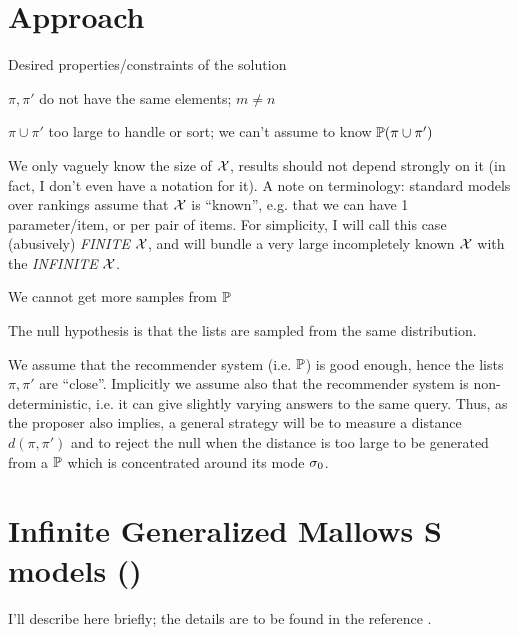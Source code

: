 \documentclass[10pt]{article}
\begin{document}
\section{Approach}
\label{sec:approach}
Desired properties/constraints of the solution
\benum
\item $\pi,\pi'$ do not have the same elements; $m\neq n$
\item $\pi \cup \pi'$ too large to handle or sort; we can't assume to know ${\mathbb P}(\pi \cup \pi')$
\item We only vaguely know the size of ${\mathcal X}$, results should not depend strongly on it (in fact, I don't even have a notation for it). A note on terminology: standard models over rankings assume that ${\mathcal X}$ is ``known'', e.g. that we can have 1 parameter/item, or per pair of items. For simplicity, I will call this case (abusively) {\em FINITE} ${\mathcal X}$, and will bundle a very large incompletely known ${\mathcal X}$ with the {\em INFINITE} ${\mathcal X}$. 
\item We cannot get more samples from ${\mathbb P}$
\item The null hypothesis is that the lists are sampled from the same distribution.
\item We assume that the recommender system (i.e. ${\mathbb P}$) is good enough, hence the lists $\pi,\pi'$ are ``close''. Implicitly we assume also that the recommender system is non-deterministic, i.e. it can give slightly varying answers to the same query.  
  \eenum
Thus, as the proposer also implies, a general strategy will be to measure a distance $d(\pi,\pi')$ and to reject the null when the distance is too large to be generated from a ${\mathbb P}$ which is concentrated around its mode $\sigma_0$. 
  

\section{Infinite Generalized Mallows S models (\gmms)}
\label{sec:gmms}

I'll describe \gmms here briefly; the details are to be found in the reference
\cite{MBao}.
\end{document}
